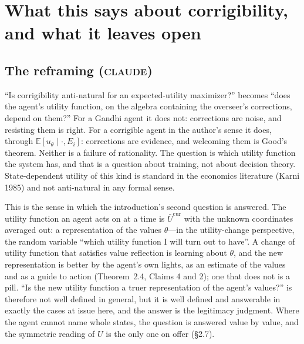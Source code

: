\documentclass[11pt,a4paper]{article}
\newcommand{\E}{\mathbb{E}}
\newcommand{\Ucur}{\bar U^{\mathrm{cur}}}
\newcommand{\CLAUDE}{\textnormal{\scshape claude}}
\begin{document}
\section{What this says about corrigibility, and what it leaves open}

\subsection{The reframing (\CLAUDE)}
``Is corrigibility anti-natural for an expected-utility maximizer?'' becomes ``does the agent's utility function, on the algebra containing the overseer's corrections, depend on them?'' For a Gandhi agent it does not: corrections are noise, and resisting them is right. For a corrigible agent in the author's sense it does, through $\E[u_\theta \mid \cdot, E_i]$: corrections are evidence, and welcoming them is Good's theorem. Neither is a failure of rationality. The question is which utility function the system has, and that is a question about training, not about decision theory. State-dependent utility of this kind is standard in the economics literature (Karni 1985) and not anti-natural in any formal sense.

This is the sense in which the introduction's second question is answered. The utility function an agent acts on at a time is $\Ucur$ with the unknown coordinates averaged out: a representation of the values $\theta$---in the utility-change perspective, the random variable ``which utility function I will turn out to have''. A change of utility function that satisfies value reflection is learning about $\theta$, and the new representation is better by the agent's own lights, as an estimate of the values and as a guide to action (Theorem~2.4, Claims 4 and 2); one that does not is a pill. ``Is the new utility function a truer representation of the agent's values?'' is therefore not well defined in general, but it is well defined and answerable in exactly the cases at issue here, and the answer is the legitimacy judgment. Where the agent cannot name whole states, the question is answered value by value, and the symmetric reading of $U$ is the only one on offer (\S2.7).
\end{document}
